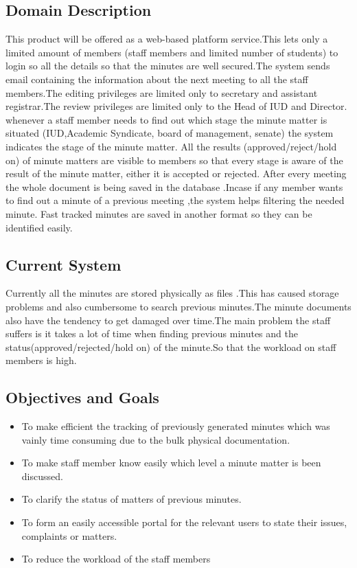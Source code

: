 \documentclass[a4paper,beamer]{article}
\begin{document}
	\subsection{Domain Description}
	This product will be offered as a web-based platform service.This  lets only a limited amount of members (staff members and limited number of students) to login so all the details  so that the minutes are well secured.The system sends email containing the information about the next meeting to all the staff members.The editing privileges are limited only to secretary and assistant registrar.The review privileges are limited only  to the Head of IUD and Director. whenever a staff member needs to find out which stage the minute matter is situated (IUD,Academic Syndicate, board of management, senate) the system indicates the stage of the minute matter.\newline
	All the results (approved/reject/hold on) of minute matters are visible to members so that every stage is aware of the result of the minute matter, either it is accepted or rejected.\newline
	After every meeting the whole document is being saved in the database .Incase if any member wants to find  out a minute of a previous meeting ,the system helps filtering the needed minute.\newline
	Fast tracked minutes are saved in another format so  they can be identified easily.\newline
	
	\subsection{Current System}
	Currently all the minutes are stored physically as files .This has caused  storage problems and also cumbersome to search previous minutes.The minute documents also have the  tendency to get damaged over time.The main problem the staff suffers is it takes a lot of time when finding previous minutes and the status(approved/rejected/hold on) of the minute.So that the workload on staff members is high.
	
	\subsection{Objectives and Goals}
	\begin{itemize}
		\item To make efficient the tracking of previously generated minutes which was vainly time consuming due to the bulk physical documentation.
		\item To make staff member know easily  which level a minute matter is been discussed.
		\item To clarify the status of matters of previous minutes.
		\item To form an easily accessible portal for the relevant users to state their issues, complaints or matters.
		\item To reduce the workload of the staff members 
	\end{itemize}
	
\end{document}
